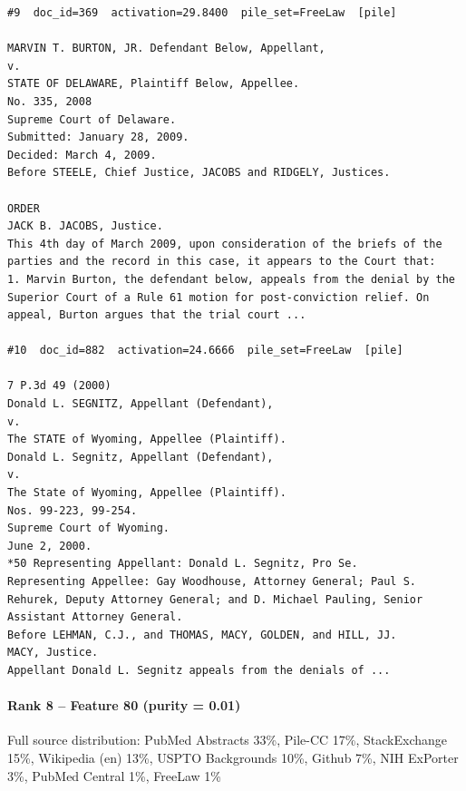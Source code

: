 \begin{verbatim}
#9  doc_id=369  activation=29.8400  pile_set=FreeLaw  [pile]

MARVIN T. BURTON, JR. Defendant Below, Appellant,
v.
STATE OF DELAWARE, Plaintiff Below, Appellee.
No. 335, 2008
Supreme Court of Delaware.
Submitted: January 28, 2009.
Decided: March 4, 2009.
Before STEELE, Chief Justice, JACOBS and RIDGELY, Justices.

ORDER
JACK B. JACOBS, Justice.
This 4th day of March 2009, upon consideration of the briefs of the parties and the record in this case, it appears to the Court that:
1. Marvin Burton, the defendant below, appeals from the denial by the Superior Court of a Rule 61 motion for post-conviction relief. On appeal, Burton argues that the trial court ...

#10  doc_id=882  activation=24.6666  pile_set=FreeLaw  [pile]

7 P.3d 49 (2000)
Donald L. SEGNITZ, Appellant (Defendant),
v.
The STATE of Wyoming, Appellee (Plaintiff).
Donald L. Segnitz, Appellant (Defendant),
v.
The State of Wyoming, Appellee (Plaintiff).
Nos. 99-223, 99-254.
Supreme Court of Wyoming.
June 2, 2000.
*50 Representing Appellant: Donald L. Segnitz, Pro Se.
Representing Appellee: Gay Woodhouse, Attorney General; Paul S. Rehurek, Deputy Attorney General; and D. Michael Pauling, Senior Assistant Attorney General.
Before LEHMAN, C.J., and THOMAS, MACY, GOLDEN, and HILL, JJ.
MACY, Justice.
Appellant Donald L. Segnitz appeals from the denials of ...

\end{verbatim}

\paragraph*{Rank 8 -- Feature 80 (purity = 0.01)}

Full source distribution: PubMed Abstracts 33\%, Pile-CC 17\%, StackExchange 15\%, Wikipedia (en) 13\%, USPTO Backgrounds 10\%, Github 7\%, NIH ExPorter 3\%, PubMed Central 1\%, FreeLaw 1\%


